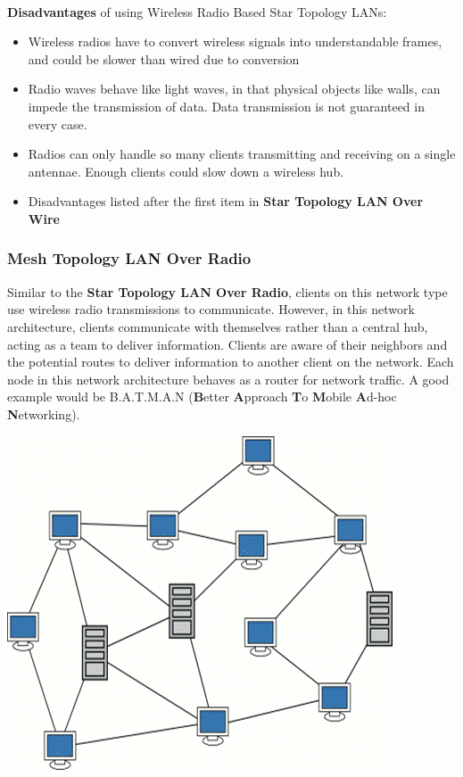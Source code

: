 \documentclass[onecolumn, draftclsnofoot,10pt, compsoc]{IEEEtran}
\begin{document}
		\noindent \\ \textbf{Disadvantages} of using Wireless Radio Based Star Topology LANs:
		\begin{itemize}
			\item Wireless radios have to convert wireless signals into understandable frames, and could be slower than wired due to conversion
			\item Radio waves behave like light waves, in that physical objects like walls, can impede the transmission of data.  Data transmission is not guaranteed in every case.
			\item Radios can only handle so many clients transmitting and receiving on a single antennae. Enough clients could slow down a wireless hub.
			\item Disadvantages listed after the first item in \textbf{Star Topology LAN Over Wire}
		\end{itemize}


		\subsubsection{Mesh Topology LAN Over Radio}
		Similar to the \textbf{Star Topology LAN Over Radio}, clients on this network type use wireless radio transmissions to communicate.
		However, in this network architecture, clients communicate with themselves rather than a central hub, acting as a team to deliver information.
		Clients are aware of their neighbors and the potential routes to deliver information to another client on the network.
		Each node in this network architecture behaves as a router for network traffic.
		A good example would be B.A.T.M.A.N (\textbf{B}etter \textbf{A}pproach \textbf{T}o \textbf{M}obile \textbf{A}d-hoc \textbf{N}etworking).  \cite{LAN4}

		\begin{center}
			\includegraphics[scale=0.6]{mesh_topology.png}
		\end{center} \cite{IMG2}
\end{document}
